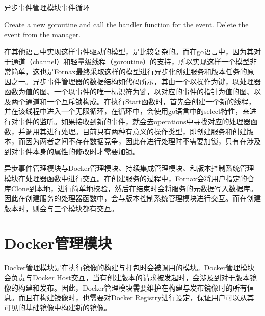 \begin{algorithm}
\caption{异步事件管理模块事件循环}
\label{algo:eventloop}
\begin{algorithmic}
\LOOP
{} 
\STATE Create a new goroutine and call the handler function for the event.
\STATE Delete the event from the manager.
\ENDIF 
\ENDLOOP
\end{algorithmic}
\end{algorithm}

在其他语言中实现这样事件驱动的模型，是比较复杂的。而在go语言中，因为其对于通道（channel）和轻量级线程（goroutine）的支持，所以实现这样一个模型非常简单，这也是Fornax最终采取这样的模型进行异步化创建服务和版本任务的原因之一。异步事件管理器的数据结构如代码所示，其由一个以操作为键，以处理器函数为值的图、一个以事件的唯一标识符为键，以对应的事件的指针为值的图、以及两个通道和一个互斥锁构成。在执行Start函数时，首先会创建一个新的线程，并在该线程中进入一个无限循环，在循环中，会使用go语言中的select特性，来进行对事件的监听。如果接收到新的事件，就会去operations中寻找对应的处理器函数，并调用其进行处理。目前只有两种有意义的操作类型，即创建服务和创建版本，而因为两者之间不存在数据竞争，因此在进行处理时不需要加锁，只有在涉及到对事件本身的属性的修改时才需要加锁。

异步事件管理模块与Docker管理模块、持续集成管理模块、和版本控制系统管理模块在处理器函数中进行交互。在创建服务的过程中，Fornax会将用户指定的仓库Clone到本地，进行简单地校验，然后在结束时会将服务的元数据写入数据库。因此在创建服务的处理器函数中，会与版本控制系统管理模块进行交互。而在创建版本时，则会与三个模块都有交互。

\section{Docker管理模块}

Docker管理模块是在执行镜像的构建与打包时会被调用的模块。Docker管理模块会负责与Docker Host交互，当有创建版本的请求被发起时，会涉及到对于版本镜像的构建和发布。因此，Docker管理模块需要维护在构建与发布镜像时的所有信息。而且在构建镜像时，也需要对Docker Registry进行设定，保证用户可以从其可见的基础镜像中构建新的镜像。


